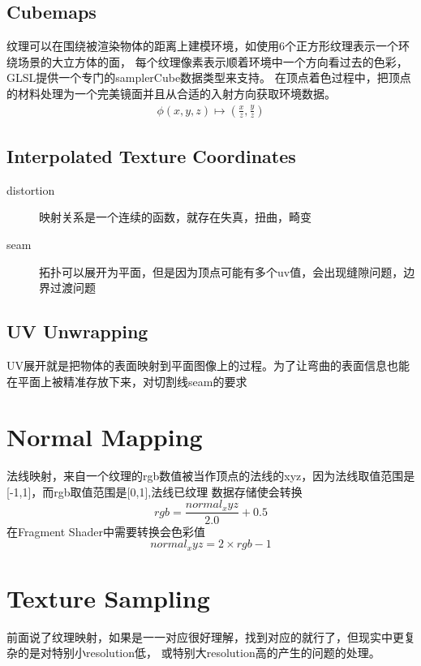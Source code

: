 \subsection{Cubemaps}

纹理可以在围绕被渲染物体的距离上建模环境，如使用6个正方形纹理表示一个环绕场景的大立方体的面，
每个纹理像素表示顺着环境中一个方向看过去的色彩，GLSL提供一个专门的samplerCube数据类型来支持。
在顶点着色过程中，把顶点的材料处理为一个完美镜面并且从合适的入射方向获取环境数据。
\begin{align*}
    \phi(x,y,z) \mapsto (\frac{x}{z},\frac{y}{z})
\end{align*}

\subsection{Interpolated Texture Coordinates }

\begin{description}
    \item [distortion] \textsf{映射关系是一个连续的函数，就存在失真，扭曲，畸变}
    \item [seam] \textsf{拓扑可以展开为平面，但是因为顶点可能有多个uv值，会出现缝隙问题，边界过渡问题}
\end{description}

\subsection{UV Unwrapping}

UV展开就是把物体的表面映射到平面图像上的过程。为了让弯曲的表面信息也能在平面上被精准存放下来，对切割线seam的要求

\section{Normal Mapping}
法线映射，来自一个纹理的rgb数值被当作顶点的法线的xyz，因为法线取值范围是[-1,1]，而rgb取值范围是[0,1],法线已纹理
数据存储使会转换
$$
rgb = \frac{normal_xyz}{2.0} + 0.5
$$
在Fragment Shader中需要转换会色彩值
$$
normal_xyz = 2 \times rgb - 1
$$

\section{Texture Sampling}

前面说了纹理映射，如果是一一对应很好理解，找到对应的就行了，但现实中更复杂的是对特别小resolution低，
或特别大resolution高的产生的问题的处理。


